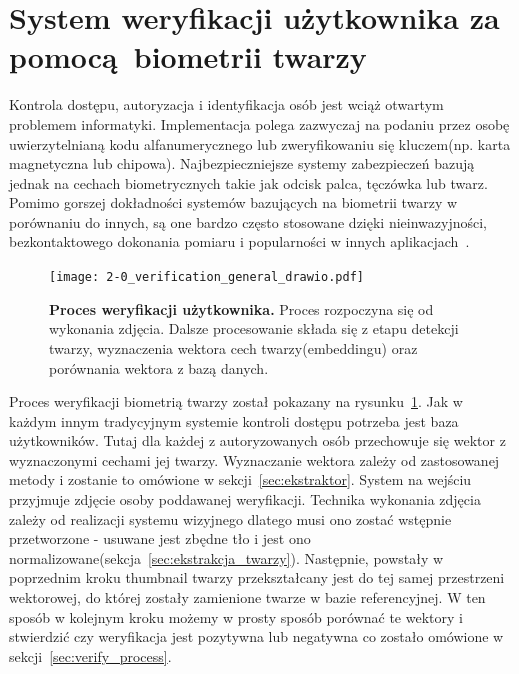 

\section[verification]{System weryfikacji użytkownika za pomocą biometrii twarzy}\label{sec:verification}

Kontrola dostępu, autoryzacja i identyfikacja osób jest wciąż otwartym problemem informatyki.
Implementacja polega zazwyczaj na podaniu przez osobę uwierzytelnianą kodu alfanumerycznego lub
zweryfikowaniu się kluczem(np. karta magnetyczna lub chipowa). Najbezpieczniejsze systemy
zabezpieczeń bazują jednak na cechach biometrycznych takie jak odcisk palca, tęczówka lub twarz.
Pomimo gorszej dokładności systemów bazujących na biometrii twarzy w porównaniu do innych, są one
bardzo często stosowane dzięki nieinwazyjności, bezkontaktowego dokonania pomiaru i popularności
w innych aplikacjach~\cite{FaceBiometric}.

\begin{figure}[h]
    \centering
    \texttt{[image: 2-0\_verification\_general\_drawio.pdf]}
    \caption{\textbf{Proces weryfikacji użytkownika.} Proces rozpoczyna się od wykonania
    zdjęcia. Dalsze procesowanie składa się z etapu detekcji twarzy, wyznaczenia wektora cech twarzy(embeddingu) oraz porównania wektora z bazą danych.}
    \label{fig:proces_weryfikacji}
\end{figure}

Proces weryfikacji biometrią twarzy został pokazany na rysunku~\ref{fig:proces_weryfikacji}. Jak
w każdym innym tradycyjnym systemie kontroli dostępu potrzeba jest baza użytkowników. Tutaj dla
każdej z autoryzowanych osób przechowuje się wektor z wyznaczonymi cechami jej twarzy.
Wyznaczanie wektora zależy od zastosowanej metody i zostanie to omówione w
sekcji~\ref{sec:ekstraktor}. System na wejściu przyjmuje zdjęcie osoby poddawanej weryfikacji.
Technika wykonania zdjęcia zależy od realizacji systemu wizyjnego dlatego musi ono zostać
wstępnie przetworzone - usuwane jest zbędne tło i jest ono normalizowane(sekcja~\ref{sec:ekstrakcja_twarzy}). Następnie, powstały w
poprzednim kroku thumbnail twarzy przekształcany jest do tej samej przestrzeni wektorowej, do
której zostały zamienione twarze w bazie referencyjnej. W ten sposób w kolejnym kroku możemy w
prosty sposób porównać te wektory i stwierdzić czy weryfikacja jest pozytywna lub negatywna co
zostało omówione w sekcji~\ref{sec:verify_process}.


